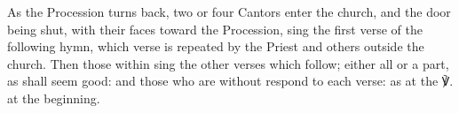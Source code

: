 \par
{}
\begin{rubric}
    As the Procession turns back, two or four Cantors enter the church, and the door being shut, with their faces toward the Procession, sing the first verse of the following hymn,  which verse is repeated by the Priest and others outside the church. Then those within sing the other verses which follow; either all or a part, as shall seem good: and those who are without respond to each verse:  as at the ℣. at the beginning.
\end{rubric}

